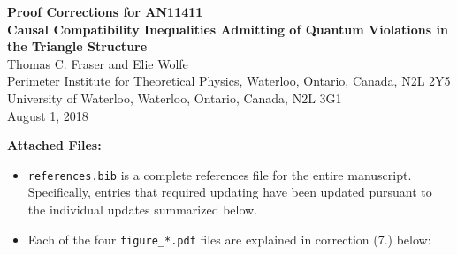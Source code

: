 \documentclass{article}
\begin{document}
    \begin{center}
        \textbf{Proof Corrections for AN11411} \\
        \textbf{Causal Compatibility Inequalities Admitting of Quantum Violations in the Triangle Structure} \\
        Thomas C. Fraser and Elie Wolfe \\
        Perimeter Institute for Theoretical Physics, Waterloo, Ontario, Canada, N2L 2Y5 \\
        University of Waterloo, Waterloo, Ontario, Canada, N2L 3G1\\
        August 1, 2018
    \end{center}

    \textbf{Attached Files:}
    \begin{itemize}
        \item {\verb|references.bib|} is a complete references file for the entire manuscript. Specifically, entries that required updating have been updated pursuant to the individual updates summarized below.
        \item Each of the four \verb|figure_*.pdf| files are explained in correction (7.) below:
    \end{itemize}
\end{document}
